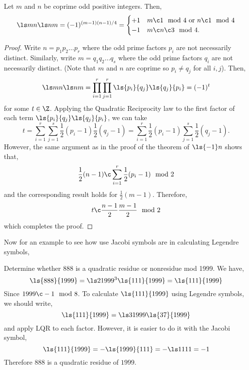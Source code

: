 \begin{nthm}
  Let $m$ and $n$ be coprime odd positive integers. Then,
  $$ \ls m n \ls n m = (-1)^{(m-1)(n - 1)/4} = \begin{cases}
    +1 & m \c 1 \mod 4 \text{ or } n \c 1 \mod 4 \\
    -1 & m \c n \c 3 \mod 4.
  \end{cases} $$
\end{nthm}
\begin{proof}
  Write $n = p_1p_2 \dots p_r$ where the odd prime factors $p_i$ are not necessarily distinct. Similarly, write $m = q_1q_2\dots q_s$ where the odd prime factors $q_i$ are not necessarily distinct. (Note that $m$ and $n$ are coprime so $p_i \ne q_j$ for all $i, j$). Then,
  $$ \ls m n\ls n m = \prod_{i=1}^r \prod_{j=1}^r \ls {p_i}{q_j}\ls {q_j}{p_i} = (-1)^t $$
  for some $t \in \Z$. Applying the Quadratic Reciprocity law to the first factor of each term $\ls {p_i}{q_j}\ls {q_j}{p_i}$, we can take
  $$ t = \sum_{i=1}^r \sum_{j=1}^s \frac{1}{2}(p_i - 1)\frac{1}{2}(q_j - 1) = \sum_{i=1}^r \frac{1}{2}(p_i - 1) \sum_{j=1}^s \frac{1}{2}(q_j - 1). $$
  However, the same argument as in the proof of the theorem of $\ls {-1} n$ shows that,
  $$ \frac{1}{2}(n - 1) \c \sum_{i=1}^r \frac{1}{2}(p_i - 1)\mod 2 $$
  and the corresponding result holds for $\frac{1}{2}(m - 1)$. Therefore,
  $$ t \c \frac{n-1}{2}\frac{m-1}{2}\mod 2 $$
  which completes the proof.
\end{proof}

\noindent
Now for an example to see how use Jacobi symbols are in calculating Legendre symbols,
\begin{eg}
  Determine whether $888$ is a quadratic residue or nonresidue mod 1999. We have,
  $$ \ls {888} {1999} = \ls 2 {1999} ^3 \ls {111} {1999} = \ls {111} {1999} $$
  Since $1999 \c -1 \mod 8$. To calculate $\ls {111} {1999}$ using Legendre symbols, we should write,
  $$ \ls {111} {1999} = \ls 3 {1999} \ls {37} {1999} $$
  and apply LQR to each factor. However, it is easier to do it with the Jacobi symbol,
  $$ \ls {111} {1999} = - \ls {1999} {111} = -\ls 1 {111} = -1$$
  Therefore $888$ is a quadratic residue of $1999$.
\end{eg}